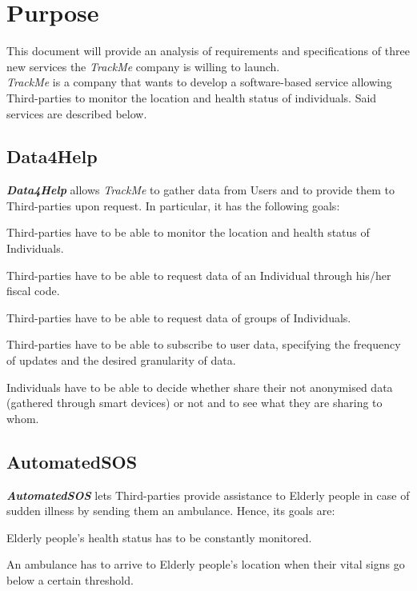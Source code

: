 \section{Purpose}
    This document will provide an analysis of requirements and specifications of three new services the \emph{TrackMe} company is willing to launch.\\
    \emph{TrackMe} is a company that wants to develop a software-based service allowing Third-parties to monitor the location and health status of individuals.
    Said services are described below.

\subsection{Data4Help}
    \textbf{\emph{Data4Help}} allows \emph{TrackMe} to gather data from Users and to provide them to Third-parties upon request. In particular, it has the following goals:
    \begin{enumerate}[label={[}G1.\arabic*{]}]
        \item Third-parties have to be able to monitor the location and health status of Individuals.
        \item Third-parties have to be able to request data of an Individual through his/her fiscal code.
        \item Third-parties have to be able to request data of groups of Individuals.
        \item Third-parties have to be able to subscribe to user data, specifying the frequency of updates and the desired granularity of data.
        \item Individuals have to be able to decide whether share their not anonymised data (gathered through smart devices) or not and to see what they are sharing to whom.
    \end{enumerate}

\subsection{AutomatedSOS}    
    \textbf{\emph{AutomatedSOS}} lets Third-parties provide assistance to Elderly people in case of sudden illness by sending them an ambulance. Hence, its goals are:
    \begin{enumerate}[label={[}G2.\arabic*{]}]
        \item Elderly people's health status has to be constantly monitored.
        \item An ambulance has to arrive to Elderly people's location when their vital signs go below a certain threshold.
    \end{enumerate}
    
